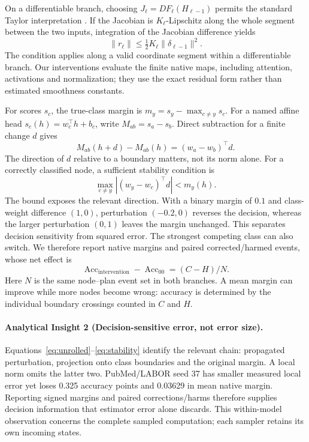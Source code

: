 \documentclass[sigconf, nonacm]{acmart}
\newcommand{\norm}[1]{\lVert #1\rVert}
\newcommand{\Acc}{\operatorname{Acc}}
\begin{document}
On a differentiable branch, choosing $J_\ell=DF_\ell(H_{\ell-1})$ permits the standard Taylor interpretation \cite{nocedal2006numerical}. If the Jacobian is $K_\ell$-Lipschitz along the whole segment between the two inputs, integration of the Jacobian difference yields
\begin{equation}
\norm{r_\ell}\leq\tfrac12K_\ell\norm{\delta_{\ell-1}}^2.
\label{eq:remainder}
\end{equation}
The condition applies along a valid coordinate segment within a differentiable branch. Our interventions evaluate the finite native maps, including attention, activations and normalization; they use the exact residual form rather than estimated smoothness constants.

For scores $s_c$, the true-class margin is $m_y=s_y-\max_{c\ne y}s_c$. For a named affine head $s_c(h)=w_c^\top h+b_c$, write $M_{ab}=s_a-s_b$. Direct subtraction for a finite change $d$ gives
\begin{equation}
M_{ab}(h+d)-M_{ab}(h)=(w_a-w_b)^\top d.
\label{eq:euclideanmargin}
\end{equation}
The direction of $d$ relative to a boundary matters, not its norm alone. For a correctly classified node, a sufficient stability condition is
\begin{equation}
\max_{c\ne y}|(w_y-w_c)^\top d|<m_y(h).
\label{eq:stability}
\end{equation}
The bound exposes the relevant direction. With a binary margin of $0.1$ and class-weight difference $(1,0)$, perturbation $(-0.2,0)$ reverses the decision, whereas the larger perturbation $(0,1)$ leaves the margin unchanged. This separates decision sensitivity from squared error. The strongest competing class can also switch. We therefore report native margins and paired corrected/harmed events, whose net effect is
\begin{equation}
\Acc_{\mathrm{intervention}}-\Acc_{00}=(C-H)/N.
\label{eq:transitions}
\end{equation}
Here $N$ is the same node--plan event set in both branches. A mean margin can improve while more nodes become wrong: accuracy is determined by the individual boundary crossings counted in $C$ and $H$.
\paragraph{\normalfont\bfseries Analytical Insight 2 (Decision-sensitive error, not error size).}
Equations~\eqref{eq:unrolled}--\eqref{eq:stability} identify the relevant chain: propagated perturbation, projection onto class boundaries and the original margin. A local norm omits the latter two. PubMed/LABOR seed 37 has smaller measured local error yet loses 0.325 accuracy points and 0.03629 in mean native margin. Reporting signed margins and paired corrections/harms therefore supplies decision information that estimator error alone discards. This within-model observation concerns the complete sampled computation; each sampler retains its own incoming states.
\end{document}
